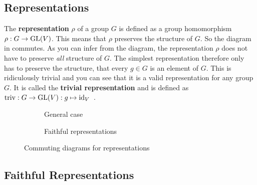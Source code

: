 \subsection{Representations}

The \textbf{representation} $\rho$ of a group $G$ is defined as a group homomorphism $\rho: G \to \operatorname{GL}(V)$.
This means that $\rho$ preserves the structure of $G$.
So the diagram in  commutes.
As you can infer from the diagram, the representation $\rho$ does not have to preserve \textit{all} structure of $G$.
The simplest representation therefore only has to preserve the structure, that every $g \in G$ is an element of $G$.
This is ridiculously trivial and you can see that it is a valid representation for any group $G$.
It is called the \textbf{trivial representation} and is defined as $\operatorname{triv}: G \to \operatorname{GL}(V): g \mapsto \operatorname{id}_V$~\cite{hein2013}.

\begin{figure}[h]
    \begin{subfigure}{.5 \textwidth}
        \centering
        \caption{General case}
        \label{fig:main.what.rep-cd}
    \end{subfigure}
    \begin{subfigure}{.5 \textwidth}
        \centering
        \caption{Faithful representations}
        \label{fig:main.what.faith-rep-cd}
    \end{subfigure}
    \caption{Commuting diagrams for representations}
\end{figure}

\subsection{Faithful Representations}

